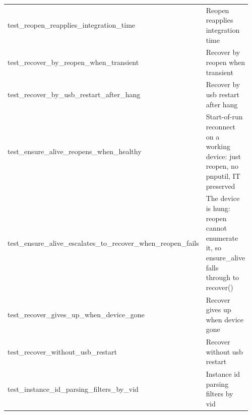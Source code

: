 \begin{longtable}{@{}>{\ttfamily\scriptsize\raggedright\arraybackslash}p{0.40\linewidth} >{\footnotesize\raggedright\arraybackslash}p{0.555\linewidth}@{}}
test\_\allowbreak{}reopen\_\allowbreak{}reapplies\_\allowbreak{}integration\_\allowbreak{}time & Reopen reapplies integration time \\
test\_\allowbreak{}recover\_\allowbreak{}by\_\allowbreak{}reopen\_\allowbreak{}when\_\allowbreak{}transient & Recover by reopen when transient \\
test\_\allowbreak{}recover\_\allowbreak{}by\_\allowbreak{}usb\_\allowbreak{}restart\_\allowbreak{}after\_\allowbreak{}hang & Recover by usb restart after hang \\
test\_\allowbreak{}ensure\_\allowbreak{}alive\_\allowbreak{}reopens\_\allowbreak{}when\_\allowbreak{}healthy & Start-of-run reconnect on a working device: just reopen, no pnputil, IT preserved \\
test\_\allowbreak{}ensure\_\allowbreak{}alive\_\allowbreak{}escalates\_\allowbreak{}to\_\allowbreak{}recover\_\allowbreak{}when\_\allowbreak{}reopen\_\allowbreak{}fails & The device is hung: reopen cannot enumerate it, so ensure\_alive falls through to recover() \\
test\_\allowbreak{}recover\_\allowbreak{}gives\_\allowbreak{}up\_\allowbreak{}when\_\allowbreak{}device\_\allowbreak{}gone & Recover gives up when device gone \\
test\_\allowbreak{}recover\_\allowbreak{}without\_\allowbreak{}usb\_\allowbreak{}restart & Recover without usb restart \\
test\_\allowbreak{}instance\_\allowbreak{}id\_\allowbreak{}parsing\_\allowbreak{}filters\_\allowbreak{}by\_\allowbreak{}vid & Instance id parsing filters by vid \\
\end{longtable}
